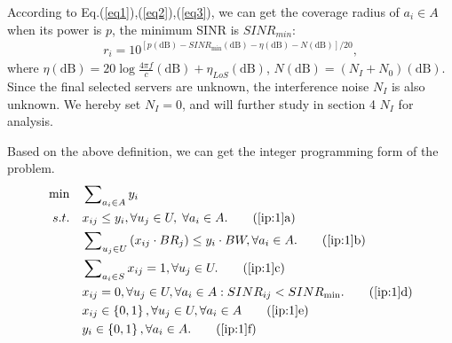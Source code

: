 \documentclass[journal]{IEEEtran}
\begin{document}


According to Eq.(\ref{eq1}),(\ref{eq2}),(\ref{eq3}), we can get the coverage radius of $a_i \in A$ when its power is $p$, the minimum SINR is $SINR_{ min} $:
\begin{eqnarray}
	{r_i} = {10^{\left[{{{p}({\text{dB}}) - SIN{R_{\min }}({\text{dB}}) - \eta ({\text{dB}}) - N({\text{dB}})}}\right]/{{20}}}},
\end{eqnarray}
where $\eta({\text{dB}}) = 20 \log{\frac{4\pi f}{c}}({\text{dB}}) + \eta_{LoS}({\text{dB}})$, $N({\text{dB}})=(N_I + N_0)({\text{dB}})$. Since the final selected servers are unknown, the interference noise $N_I$ is also unknown. We hereby set $N_I=0$, and will further study in section 4 $N_I$ for analysis.



%
Based on the above definition, we can get the integer programming form of the problem.
\begin{align}
	\min \quad  & \sum\nolimits_{{a_i} \in A} {{y_i}}  \label{ip:1}\\
	s.t.\quad &  {x_{ij}} \le {y_i},  \forall {u_j} \in U,\;\forall {a_i} \in A. \tag{\ref{ip:1}{a}}\label{ip:1.1}\\
	&  \sum\nolimits_{{u_j} \in U} {({x_{ij}} \cdot B{R_j})}  \le {y_i} \cdot BW,\forall {a_i} \in A. \tag{\ref{ip:1}{b}}\label{ip:1.2}\\
	&  \sum\nolimits_{{a_i} \in S} {{x_{ij}}}  = 1,\forall {u_j} \in U. \tag{\ref{ip:1}{c}}\label{ip:1.3}\\
	&  {x_{ij}} = 0,\forall {u_j} \in U,\forall {a_i} \in A:SIN{R_{ij}} < SIN{R_{\min }}. \tag{\ref{ip:1}{d}}\label{ip:1.4}\\
	&  {x_{ij}} \in \left\{ {0,1} \right\},\forall u_j \in U,\forall {a_i} \in A \tag{\ref{ip:1}{e}}\label{ip:1.5}\\
	&  {y_{i}} \in \left\{ {0,1} \right\},\forall {a_i} \in A. \tag{\ref{ip:1}{f}}\label{ip:1.6}
\end{align}
\end{document}
